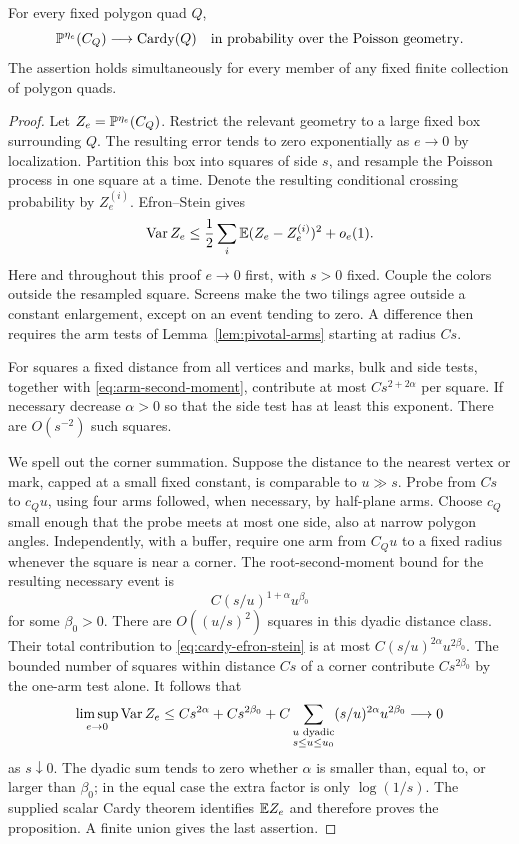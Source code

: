 \begin{proposition}\label{prop:quenched-cardy}
For every fixed polygon quad $Q$,
\[
 \mathbb P^{\eta_e}(C_Q)\longrightarrow\operatorname{Cardy}(Q)
 \quad\text{in probability over the Poisson geometry}.
\]
The assertion holds simultaneously for every member of any fixed
finite collection of polygon quads.
\end{proposition}

\begin{proof}
Let $Z_e=\mathbb P^{\eta_e}(C_Q)$.  Restrict the relevant geometry to a
large fixed box surrounding $Q$.  The resulting error tends to
zero exponentially as $e\to0$ by localization.  Partition this
box into squares of side $s$, and resample the Poisson process in
one square at a time.  Denote the resulting conditional crossing
probability by $Z_e^{(i)}$.  Efron--Stein gives
\begin{equation}\label{eq:cardy-efron-stein}
 \operatorname{Var} Z_e\le \frac12\sum_i\mathbb E (Z_e-Z_e^{(i)})^2+o_e(1).
\end{equation}
Here and throughout this proof $e\to0$ first, with $s>0$ fixed.
Couple the colors outside the resampled square.  Screens make the
two tilings agree outside a constant enlargement, except on an
event tending to zero.  A difference then requires the arm tests
of Lemma~\ref{lem:pivotal-arms} starting at radius $Cs$.

For squares a fixed distance from all vertices and marks, bulk and
side tests, together with \eqref{eq:arm-second-moment}, contribute
at most $C s^{2+2\alpha}$ per square.  If necessary decrease
$\alpha>0$ so that the side test has at least this exponent.
There are $O(s^{-2})$ such squares.

We spell out the corner summation.  Suppose the distance to the
nearest vertex or mark, capped at a small fixed constant, is
comparable to $u\gg s$.  Probe from $Cs$ to $c_Q u$, using four
arms followed, when necessary, by half-plane arms.  Choose $c_Q$
small enough that the probe meets at most one side, also at narrow
polygon angles.  Independently, with a buffer, require one arm
from $C_Q u$ to a fixed radius whenever the square is near a
corner.  The root-second-moment bound for the resulting necessary
event is
\[
 C(s/u)^{1+\alpha}u^{\beta_0}
\]
for some $\beta_0>0$.  There are $O((u/s)^2)$ squares in this
dyadic distance class.  Their total contribution to
\eqref{eq:cardy-efron-stein} is at most
$C(s/u)^{2\alpha}u^{2\beta_0}$.  The bounded number of squares
within distance $Cs$ of a corner contribute $C s^{2\beta_0}$
by the one-arm test alone.  It follows that
\[
 \limsup_{e\to0}\operatorname{Var} Z_e
 \le C s^{2\alpha}+C s^{2\beta_0}
   +C\sum_{\substack{u\text{ dyadic}\\s\le u\le u_0}}
            (s/u)^{2\alpha}u^{2\beta_0}
 \longrightarrow0
\]
as $s\downarrow0$.  The dyadic sum tends to zero whether
$\alpha$ is smaller than, equal to, or larger than $\beta_0$;
in the equal case the extra factor is only $\log(1/s)$.
The supplied scalar Cardy theorem identifies $\mathbb E Z_e$ and
therefore proves the proposition.  A finite union gives the last
assertion.
\end{proof}

